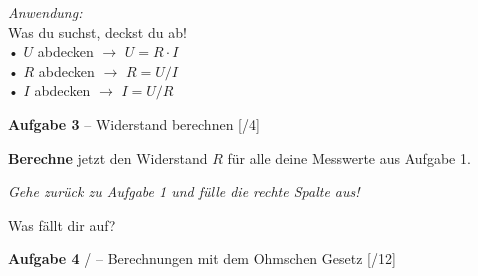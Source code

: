 \documentclass[11pt, a4paper]{article}
\newif\ifzeigesternchen
\newcommand{\luecke}[1]{\underline{\hspace{#1}}}
\newcommand{\punktebox}[1]{\hfill\small\textcolor{mittelgrau}{[\hspace{0.8em}/#1]}}
\newcommand{\stern}[1]{\ifzeigesternchen\textsuperscript{\textcolor{fachfarbe}{(#1)}}\fi}
\newcommand{\aufgabe}[2]{%
    \needspace{4\baselineskip}%
    \vspace{8pt}%
    \noindent\textbf{\textcolor{fachfarbe}{Aufgabe #1}} #2%
    \vspace{4pt}%
    \nopagebreak[4]%
}
\newcommand{\operator}[1]{\textbf{#1}}
\begin{document}
\begin{merkkasten}
\begin{minipage}[t]{0.5\linewidth}
\begin{center}
\end{center}
\end{minipage}%
\begin{minipage}[t]{0.5\linewidth}
\small
\textit{Anwendung:}\\[0.3em]
Was du suchst, deckst du ab!\\[0.2em]
• $U$ abdecken $\rightarrow$ $U = R \cdot I$\\[0.1em]
• $R$ abdecken $\rightarrow$ $R = U / I$\\[0.1em]
• $I$ abdecken $\rightarrow$ $I = U / R$
\end{minipage}
\end{merkkasten}


\aufgabe{3}{\stern{*} – Widerstand berechnen} \punktebox{4}

\operator{Berechne} jetzt den Widerstand $R$ für alle deine Messwerte aus Aufgabe 1.

\vspace{0.3em}
\begin{hinweiskasten}
\textit{Gehe zurück zu Aufgabe 1 und fülle die rechte Spalte aus!}
\end{hinweiskasten}

\vspace{0.3em}
Was fällt dir auf? \luecke{10cm}


\aufgabe{4}{\stern{*}/\stern{**} – Berechnungen mit dem Ohmschen Gesetz} \punktebox{12}
\end{document}
